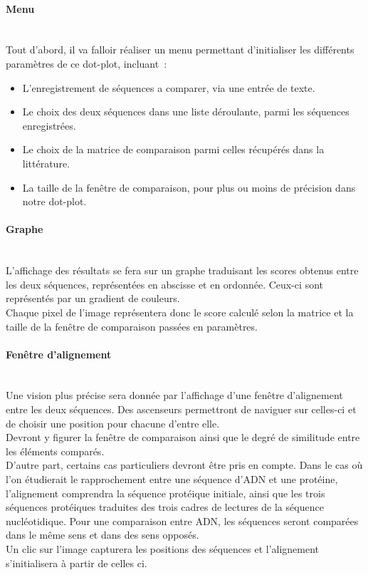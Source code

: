 \documentclass{report}
\begin{document}
\paragraph{Menu} ~\\
Tout d'abord, il va falloir réaliser un menu permettant d'initialiser les différents paramètres de ce dot-plot, incluant~:
\begin{itemize}
	\item L'enregistrement de séquences a comparer, via une entrée de texte.
	\item Le choix des deux séquences dans une liste déroulante, parmi les séquences enregistrées.
	\item Le choix de la matrice de comparaison parmi celles récupérés dans la littérature.
	\item La taille de la fenêtre de comparaison, pour plus ou moins de précision dans notre dot-plot.
\end{itemize}

\paragraph{Graphe} ~\\
	L'affichage des résultats se fera sur un graphe traduisant les scores obtenus entre les deux séquences, représentées en abscisse et en ordonnée. Ceux-ci sont représentés par un gradient de couleurs.\\
Chaque pixel de l'image représentera donc le score calculé selon la matrice et la taille de la fenêtre de comparaison passées en paramètres.

\paragraph{Fenêtre d'alignement} ~\\
	Une vision plus précise sera donnée par l'affichage d'une fenêtre d'alignement entre les deux séquences.
Des ascenseurs permettront de naviguer sur celles-ci et de choisir une position pour chacune d'entre elle.\\
Devront y figurer la fenêtre de comparaison ainsi que le degré de similitude entre les éléments comparés.\\
D'autre part, certains cas particuliers devront être pris en compte.
Dans le cas où l'on étudierait le rapprochement entre une séquence d'ADN et une protéine, l'alignement comprendra la séquence protéique initiale, ainsi que les trois séquences protéiques traduites des trois cadres de lectures de la séquence nucléotidique.
Pour une comparaison entre ADN, les séquences seront comparées dans le même sens et dans des sens opposés.\\
Un clic sur l'image capturera les positions des séquences et l'alignement s'initialisera à partir de celles ci.
\end{document}
